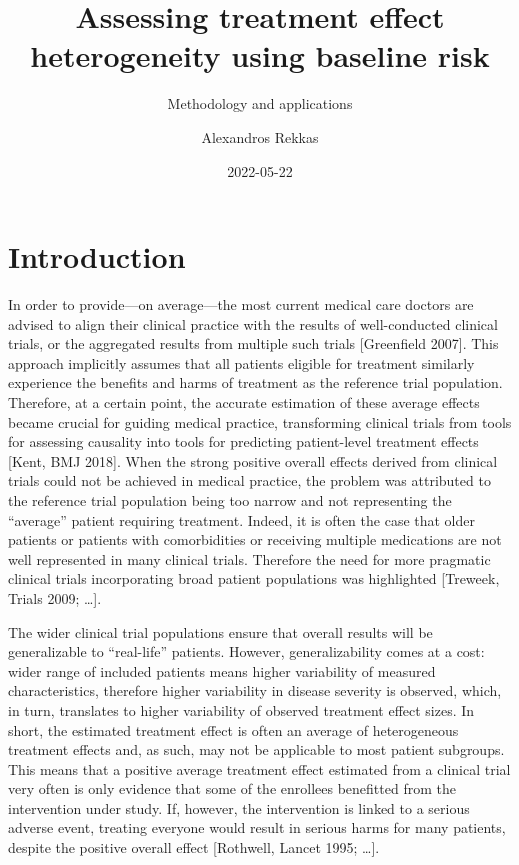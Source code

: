 \documentclass[
]{book}
\title{Assessing treatment effect heterogeneity using baseline risk}
\subtitle{Methodology and applications}
\author{Alexandros Rekkas}
\date{2022-05-22}
\begin{document}
\maketitle

{
\setcounter{tocdepth}{1}
\tableofcontents
}
\hypertarget{introduction}{%
\chapter{Introduction}\label{introduction}}

In order to provide---on average---the most current medical care doctors are
advised to align their clinical practice with the results of well-conducted
clinical trials, or the aggregated results from multiple such trials {[}Greenfield
2007{]}. This approach implicitly assumes that all patients eligible for treatment
similarly experience the benefits and harms of treatment as the reference trial
population. Therefore, at a certain point, the accurate estimation of these
average effects became crucial for guiding medical practice, transforming
clinical trials from tools for assessing causality into tools for predicting
patient-level treatment effects {[}Kent, BMJ 2018{]}. When the strong positive
overall effects derived from clinical trials could not be achieved in medical
practice, the problem was attributed to the reference trial population being too
narrow and not representing the ``average'' patient requiring treatment. Indeed,
it is often the case that older patients or patients with comorbidities or
receiving multiple medications are not well represented in many clinical
trials. Therefore the need for more pragmatic clinical trials incorporating
broad patient populations was highlighted {[}Treweek, Trials 2009; \ldots{]}.

The wider clinical trial populations ensure that overall results will be
generalizable to ``real-life'' patients. However, generalizability comes at a
cost: wider range of included patients means higher variability of measured
characteristics, therefore higher variability in disease severity is observed,
which, in turn, translates to higher variability of observed treatment effect
sizes. In short, the estimated treatment effect is often an average of
heterogeneous treatment effects and, as such, may not be applicable to most
patient subgroups. This means that a positive average treatment effect estimated
from a clinical trial very often is only evidence that some of the enrollees
benefitted from the intervention under study. If, however, the intervention is
linked to a serious adverse event, treating everyone would result in serious
harms for many patients, despite the positive overall effect {[}Rothwell, Lancet
1995; \ldots{]}.
\end{document}
